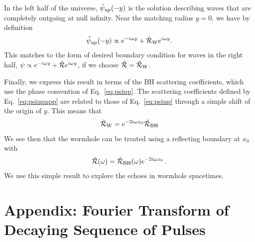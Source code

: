 \begin{refsection}
In the left half of the universe, $\tilde \psi_{\rm up}(-y)$ is the solution describing waves that are completely outgoing at null infinity. 
Near the matching radius $y=0$, we have by definition
\begin{align}
\tilde \psi_{\rm up}(-y)\propto e^{-i\omega y}+\tilde{\mathcal R}_{\rm W} e^{i\omega y}.
\end{align}
This matches to the form of desired boundary condition for waves in the right half, $\psi \propto e^{-i\omega y}+\tilde{\mathcal R} e^{i\omega y}$, if we choose $\tilde{\mathcal R}=\tilde{\mathcal R}_{\rm W}$. 

Finally, we express this result in terms of the BH scattering coefficients, which use the phase convention of Eq.~\eqref{eq:psiup}. 
The scattering coefficients defined by Eq.~\eqref{eq:psiupapp} are related to those of Eq.~\eqref{eq:psiup} through a simple shift of the origin of $y$.
This means that
\begin{align}
\tilde{\mathcal R}_{\rm W} = e^{-2i\omega x_0}\tilde{\mathcal R}_{\rm BH}
\end{align}
We see then that the wormhole can be treated using a reflecting boundary at $x_0$ with
\begin{align}
\tilde{\mathcal R}(\omega)=\tilde{\mathcal R}_{\rm BH}(\omega)e^{-2i\omega x_0}\,.
\end{align}
We use this simple result to explore the echoes in wormhole spacetimes.

\section{Appendix: Fourier Transform of Decaying Sequence of Pulses}
\label{sec:DDcomb}


\end{refsection}
